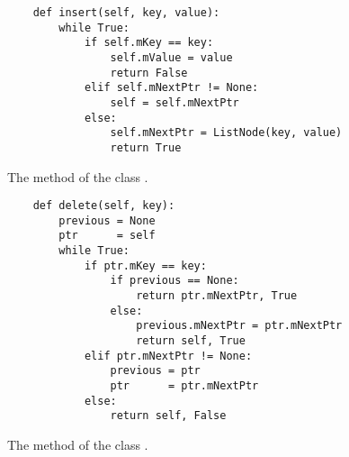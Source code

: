 \begin{figure}[!ht]
\centering
\begin{verbatim}
    def insert(self, key, value):
        while True:
            if self.mKey == key:
                self.mValue = value
                return False
            elif self.mNextPtr != None:
                self = self.mNextPtr
            else:
                self.mNextPtr = ListNode(key, value)
                return True
\end{verbatim}
\vspace*{-0.3cm}
\caption{The method  of the class .}
\label{fig:ListNode.ipynb:insert}
\end{figure}
\begin{figure}[!hb]
\centering
\begin{verbatim}
    def delete(self, key):
        previous = None
        ptr      = self
        while True:
            if ptr.mKey == key:
                if previous == None:
                    return ptr.mNextPtr, True
                else:
                    previous.mNextPtr = ptr.mNextPtr
                    return self, True
            elif ptr.mNextPtr != None:
                previous = ptr
                ptr      = ptr.mNextPtr
            else:
                return self, False
\end{verbatim}
\vspace*{-0.3cm}
\caption{The method  of the class .}
\label{fig:ListNode.ipynb:delete}
\end{figure}

